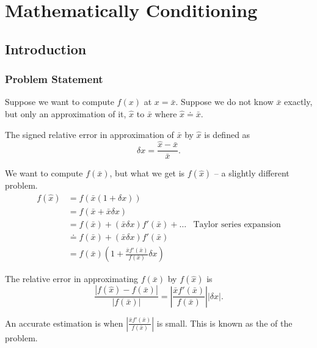 \chapter{Mathematically Conditioning}

\section{Introduction}

\subsection{Problem Statement}

Suppose we want to compute \( f(x) \) at \( x = \bar{x} \). Suppose we do not know \( \bar{x} \) exactly, but only an approximation of it, \( \hat{x} \) to \( \bar{x} \) where \( \hat{x} \doteq \bar{x} \).

\begin{definition}
    The signed relative error in approximation of \( \bar{x} \) by \( \hat{x} \) is defined as \[
        \delta x = \frac{\hat{x} - \bar{x}}{\bar{x}}.
    \]
\end{definition}

We want to compute \( f(\bar{x}) \), but what we get is \( f(\hat{x}) \) -- a slightly different problem. \begin{align*}
    f(\hat{x})
     & = f(\bar{x}(1 + \delta x))                                                      \\
     & = f(\bar{x} + \bar{x} \delta x)                                                 \\
     & = f(\bar{x}) + (\bar{x} \delta x) f'(\bar{x}) + \dots
     & \text{Taylor series expansion}                                                  \\
     & \doteq f(\bar{x}) + (\bar{x} \delta x) f'(\bar{x})                              \\
     & = f(\bar{x}) \left( 1 + \frac{\bar{x} f'(\bar{x})}{f(\bar{x})} \delta x \right)
\end{align*}

The relative error in approximating \( f(\bar{x}) \) by \( f(\hat{x}) \) is \[
    \frac{|f(\hat{x}) - f(\bar{x})|}{|f(\bar{x})|} = \left| \frac{\bar{x} f'(\bar{x})}{f(\bar{x})} \right| | \delta x |.
\]

An accurate estimation is when \( \left| \frac{\bar{x} f'(\bar{x})}{f(\bar{x})} \right| \) is small. This is known as the  of the problem.

